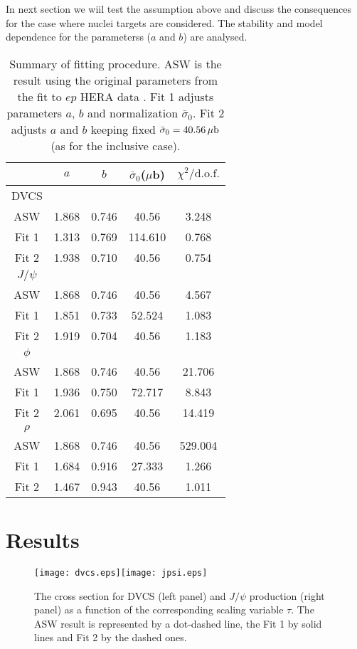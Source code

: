 \documentclass[twocolumn,showpacs,preprintnumbers,amsmath,amssymb,showkeys,aps,prd,a4paper,byrevtex]{revtex4}
\begin{document}
In next section we wiil test the assumption above and discuss the consequences for the case where nuclei targets are considered. The stability and model dependence for the parameterss ($a$ and $b$) are analysed.

\begin{table}[t]
\begin{tabular}{||c|c|c|c|c||} \hline\hline
 & $a$ & $b$ & $\bar{\sigma}_0$($\mu$b) & $\chi^2/\mathrm{d.o.f.}$  \\ \hline
DVCS & & & & \\ \hline
ASW & 1.868 & 0.746 & 40.56 & 3.248 \\ \hline
Fit 1 & 1.313 & 0.769 & 114.610 & 0.768 \\ \hline
Fit 2 & 1.938 & 0.710 & 40.56 & 0.754 \\ \hline
$J/\psi$ & & & & \\ \hline
ASW & 1.868 & 0.746 & 40.56 & 4.567 \\ \hline
Fit 1 & 1.851 & 0.733 & 52.524 & 1.083 \\ \hline
Fit 2 & 1.919 & 0.704 & 40.56 & 1.183 \\ \hline
$\phi$ & & & & \\ \hline
ASW & 1.868 & 0.746 & 40.56 & 21.706 \\ \hline
Fit 1 & 1.936 & 0.750 & 72.717 & 8.843 \\ \hline
Fit 2 & 2.061 & 0.695 & 40.56 & 14.419 \\ \hline
$\rho$ & & & & \\ \hline
ASW & 1.868 & 0.746 & 40.56 & 529.004 \\ \hline
Fit 1 & 1.684 & 0.916 & 27.333 & 1.266 \\ \hline
Fit 2 & 1.467 & 0.943 & 40.56 & 1.011 \\ \hline \hline
\end{tabular}
\caption{\label{tab:chi} Summary of fitting procedure. ASW is the result using the original parameters from the fit to $ep$ HERA data \cite{Armesto_scal}. Fit 1 adjusts parameters $a$, $b$ and normalization $\bar{\sigma}_0$. Fit 2 adjusts $a$ and $b$ keeping fixed $\bar\sigma_0=\unit[40.56]{\mu b}$ (as for the inclusive case).}
\end{table}


\section{Results \label{sec:result}}
\begin{figure*}[t]
 \texttt{[image: dvcs.eps]}\texttt{[image: jpsi.eps]}
 \caption{The cross section for DVCS (left panel) \cite{dvcs} and $J/\psi$ production (right panel) \cite{jpsi} as a function of the corresponding scaling variable $\tau$. The ASW result is represented by a dot-dashed line, the Fit 1 by solid lines and Fit 2 by the dashed ones.} 
 \label{fig:1}
 \end{figure*}
\end{document}
